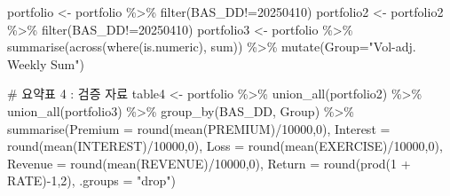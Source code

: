\documentclass[
  a4paper,
  DIV=11,
  numbers=noendperiod]{scrreprt}
\newenvironment{Shaded}{\begin{snugshade}}{\end{snugshade}}
\newcommand{\AttributeTok}[1]{\textcolor[rgb]{0.40,0.45,0.13}{#1}}
\newcommand{\CommentTok}[1]{\textcolor[rgb]{0.37,0.37,0.37}{#1}}
\newcommand{\DecValTok}[1]{\textcolor[rgb]{0.68,0.00,0.00}{#1}}
\newcommand{\FunctionTok}[1]{\textcolor[rgb]{0.28,0.35,0.67}{#1}}
\newcommand{\NormalTok}[1]{\textcolor[rgb]{0.00,0.23,0.31}{#1}}
\newcommand{\OtherTok}[1]{\textcolor[rgb]{0.00,0.23,0.31}{#1}}
\newcommand{\SpecialCharTok}[1]{\textcolor[rgb]{0.37,0.37,0.37}{#1}}
\newcommand{\StringTok}[1]{\textcolor[rgb]{0.13,0.47,0.30}{#1}}
\begin{document}
\begin{Shaded}
\begin{Highlighting}[]
\NormalTok{portfolio }\OtherTok{\textless{}{-}}\NormalTok{ portfolio }\SpecialCharTok{\%\textgreater{}\%} \FunctionTok{filter}\NormalTok{(BAS\_DD}\SpecialCharTok{!=}\DecValTok{20250410}\NormalTok{)}
\NormalTok{portfolio2 }\OtherTok{\textless{}{-}}\NormalTok{ portfolio2 }\SpecialCharTok{\%\textgreater{}\%} \FunctionTok{filter}\NormalTok{(BAS\_DD}\SpecialCharTok{!=}\DecValTok{20250410}\NormalTok{)}
\NormalTok{portfolio3 }\OtherTok{\textless{}{-}}\NormalTok{ portfolio }\SpecialCharTok{\%\textgreater{}\%} 
  \FunctionTok{summarise}\NormalTok{(}\FunctionTok{across}\NormalTok{(}\FunctionTok{where}\NormalTok{(is.numeric), sum)) }\SpecialCharTok{\%\textgreater{}\%} 
  \FunctionTok{mutate}\NormalTok{(}\AttributeTok{Group=}\StringTok{"Vol{-}adj. Weekly Sum"}\NormalTok{)}
  

\CommentTok{\# 요약표 4 : 검증 자료}
\NormalTok{table4 }\OtherTok{\textless{}{-}}\NormalTok{ portfolio }\SpecialCharTok{\%\textgreater{}\%}
  \FunctionTok{union\_all}\NormalTok{(portfolio2) }\SpecialCharTok{\%\textgreater{}\%}
  \FunctionTok{union\_all}\NormalTok{(portfolio3) }\SpecialCharTok{\%\textgreater{}\%} 
  \FunctionTok{group\_by}\NormalTok{(BAS\_DD, Group) }\SpecialCharTok{\%\textgreater{}\%}
  \FunctionTok{summarise}\NormalTok{(}\AttributeTok{Premium =} \FunctionTok{round}\NormalTok{(}\FunctionTok{mean}\NormalTok{(PREMIUM)}\SpecialCharTok{/}\DecValTok{10000}\NormalTok{,}\DecValTok{0}\NormalTok{),}
            \AttributeTok{Interest =} \FunctionTok{round}\NormalTok{(}\FunctionTok{mean}\NormalTok{(INTEREST)}\SpecialCharTok{/}\DecValTok{10000}\NormalTok{,}\DecValTok{0}\NormalTok{),}
            \AttributeTok{Loss =} \FunctionTok{round}\NormalTok{(}\FunctionTok{mean}\NormalTok{(EXERCISE)}\SpecialCharTok{/}\DecValTok{10000}\NormalTok{,}\DecValTok{0}\NormalTok{),}
            \AttributeTok{Revenue =} \FunctionTok{round}\NormalTok{(}\FunctionTok{mean}\NormalTok{(REVENUE)}\SpecialCharTok{/}\DecValTok{10000}\NormalTok{,}\DecValTok{0}\NormalTok{),}
            \AttributeTok{Return =} \FunctionTok{round}\NormalTok{(}\FunctionTok{prod}\NormalTok{(}\DecValTok{1} \SpecialCharTok{+}\NormalTok{ RATE)}\SpecialCharTok{{-}}\DecValTok{1}\NormalTok{,}\DecValTok{2}\NormalTok{),}
            \AttributeTok{.groups =} \StringTok{"drop"}\NormalTok{)}


\end{Highlighting}
\end{Shaded}
\end{document}
